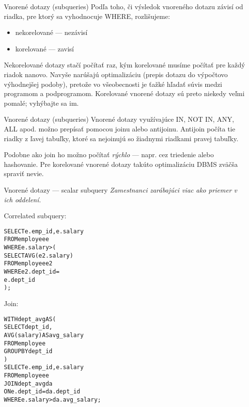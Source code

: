 \documentclass[12pt]{beamer}
\def\blue#1{\textcolor{Cerulean}{#1}}
\begin{document}
\begin{frame}[fragile]{Vnorené dotazy (subqueries)}
Podľa toho, či výsledok vnoreného dotazu závisí od riadka, pre ktorý sa vyhodnocuje WHERE, rozlišujeme:
\begin{itemize}
\item \alert{nekorelované} --- nezávisí
\item \alert{korelované} --- zavisí
\end{itemize}
Nekorelované dotazy stačí počítať raz, kým korelované musíme počítať pre každý riadok nanovo.
Navyše narúšajú optimalizáciu (prepis dotazu do výpočtovo výhodnejšej podoby),
pretože vo všeobecnosti je ťažké hľadať súvis medzi programom a podprogramom.
Korelované vnorené dotazy sú preto niekedy veľmi pomalé; vyhýbajte sa im.
\end{frame}

\begin{frame}[fragile]{Vnorené dotazy (subqueries)}
Vnorené dotazy využívajúce IN, NOT IN, ANY, ALL apod. možno prepísať pomocou joinu alebo \alert{antijoinu}.
Antijoin počíta tie riadky z ľavej tabuľky, ktoré sa nejoinujú so žiadnymi riadkami pravej tabuľky.
\bigskip

Podobne ako join ho možno počítať \emph{rýchlo} --- napr. cez triedenie alebo hashovanie.
Pre korelované vnorené dotazy takúto optimalizáciu DBMS zväčša spraviť nevie.
\end{frame}

\begin{frame}[fragile]{Vnorené dotazy --- scalar subquery}
\footnotesize
\emph{Zamestnanci zarábajúci viac ako priemer v ich oddelení.}\\[7mm]
\begin{minipage}{.4\pdfpagewidth}
Correlated subquery:
\footnotesize
\begin{alltt}
SELECT e.emp_id, e.salary
FROM employee e
WHERE \blue{e.salary >} (
  SELECT AVG(e2.salary)
  FROM employee e2
  WHERE e2.dept_id =
    e.dept_id
);



\end{alltt}
\end{minipage}
\hfill\vline\hfill
\begin{minipage}{.4\pdfpagewidth}
Join:
\footnotesize
\begin{alltt}
WITH dept_avg AS (
  SELECT dept_id,
    AVG(salary) AS avg_salary
  FROM employee
  GROUP BY dept_id
)
SELECT e.emp_id, e.salary
FROM employee e
  JOIN dept_avg da
    ON e.dept_id = da.dept_id
WHERE \blue{e.salary >} da.avg_salary;
\end{alltt}
\end{minipage}
\end{frame}
\end{document}
